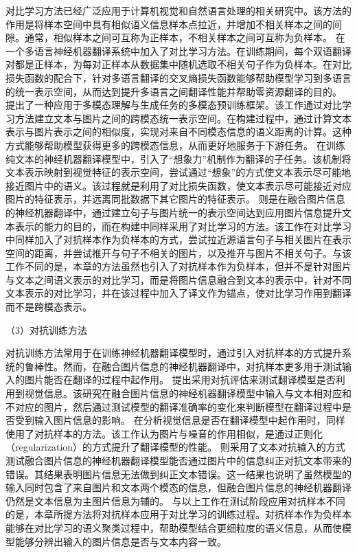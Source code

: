对比学习方法已经广泛应用于计算机视觉和自然语言处理的相关研究中。该方法的作用是将样本空间中具有相似语义信息样本点拉近，并增加不相关样本之间的间隙。通常，相似样本之间可互称为正样本，不相关样本之间可互称为负样本。
在一个多语言神经机器翻译系统中加入了对比学习方法。在训练期间，每个双语翻译对都是正样本，为每对正样本从数据集中随机选取不相关句子作为负样本。在对比损失函数的配合下，针对多语言翻译的交叉熵损失函数能够帮助模型学习到多语言的统一表示空间，从而达到提升多语言之间翻译性能并帮助零资源翻译的目的。
提出了一种应用于多模态理解与生成任务的多模态预训练框架。该工作通过对比学习方法建立文本与图片之间的跨模态统一表示空间。在构建过程中，通过计算文本表示与图片表示之间的相似度，实现对来自不同模态信息的语义距离的计算。这种方式能够帮助模型获得更多的跨模态信息，从而更好地服务于下游任务。
在训练纯文本的神经机器翻译模型中，引入了“想象力”机制作为翻译的子任务。该机制将文本表示映射到视觉特征的表示空间，尝试通过“想象”的方式使文本表示尽可能地接近图片中的语义。该过程就是利用了对比损失函数，使文本表示尽可能接近对应图片的特征表示，并远离同批数据下其它图片的特征表示。
则是在融合图片信息的神经机器翻译中，通过建立句子与图片统一的表示空间达到应用图片信息提升文本表示的能力的目的，而在构建中同样采用了对比学习的方法。该工作在对比学习中同样加入了对抗样本作为负样本的方式，尝试拉近源语言句子与相关图片在表示空间的距离，并尝试推开与句子不相关的图片，以及推开与图片不相关句子。与该工作不同的是，本章的方法虽然也引入了对抗样本作为负样本，但并不是针对图片与文本之间语义表示的对比学习，而是将图片信息融合到文本的表示中，针对不同文本表示的对比学习，并在该过程中加入了译文作为锚点，使对比学习作用到翻译而不是跨模态表示。

{\sffamily （3）对抗训练方法}

对抗训练方法常用于在训练神经机器翻译模型时，通过引入对抗样本的方式提升系统的鲁棒性。然而，在融合图片信息的神经机器翻译中，对抗样本更多用于测试输入的图片能否在翻译的过程中起作用。
提出采用对抗评估来测试翻译模型是否利用到视觉信息。该研究在融合图片信息的神经机器翻译模型中输入与文本相对应和不对应的图片，然后通过测试模型的翻译准确率的变化来判断模型在翻译过程中是否受到输入图片信息的影响。
在分析视觉信息是否在翻译模型中起作用时，同样使用了对抗样本的方法。该工作认为图片与噪音的作用相似，是通过正则化（regularization）的方式提升了翻译模型的性能。
则采用了文本对抗输入的方式测试融合图片信息的神经机器翻译模型能否通过图片中的信息纠正对抗文本带来的错误。其结果表明图片信息无法做到纠正文本错误。这一结果也说明了虽然模型的输入同时包含了来自图片和文本两个模态的信息，但融合图片信息的神经机器翻译仍然是文本信息为主图片信息为辅的。
与以上工作在测试阶段应用对抗样本不同的是，本章所提方法将对抗样本应用于对比学习的训练过程。对抗样本作为负样本能够在对比学习的语义聚类过程中，帮助模型结合更细粒度的语义信息，从而使模型能够分辨出输入的图片信息是否与文本内容一致。